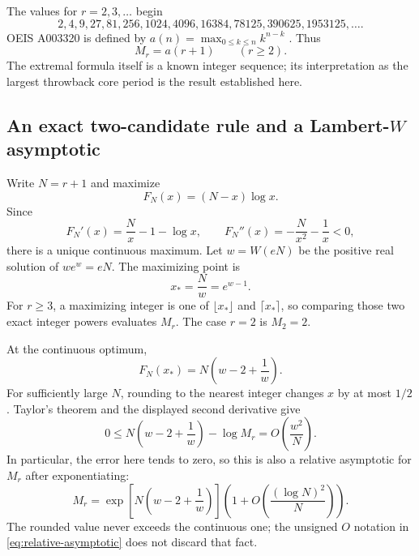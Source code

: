 \documentclass[11pt,letterpaper]{article}
\theoremstyle{definition}
\begin{document}
The values for $r=2,3,\ldots$ begin
\[
 2,4,9,27,81,256,1024,4096,16384,78125,390625,1953125,\ldots.
\]
OEIS A003320 is defined by $a(n)=\max_{0\le k\le n}k^{n-k}$
\cite{A003320}. Thus
\begin{equation}\label{eq:oeismax}
 M_r=a(r+1)\qquad(r\ge2).
\end{equation}
The extremal formula itself is a known integer sequence; its interpretation
as the largest throwback core period is the result established here.

\subsection{An exact two-candidate rule and a Lambert-\texorpdfstring{$W$}{W} asymptotic}
Write $N=r+1$ and maximize
\[
 F_N(x)=(N-x)\log x.
\]
Since
\[
 F_N'(x)=\frac Nx-1-\log x,
 \qquad F_N''(x)=-\frac N{x^2}-\frac1x<0,
\]
there is a unique continuous maximum. Let $w=W(eN)$ be the positive real
solution of $we^w=eN$. The maximizing point is
\begin{equation}\label{eq:kstar}
 x_*=\frac Nw=e^{w-1}.
\end{equation}
For $r\ge3$, a maximizing integer is one of
$\lfloor x_*\rfloor$ and $\lceil x_*\rceil$, so comparing those two exact
integer powers evaluates $M_r$. The case $r=2$ is $M_2=2$.

At the continuous optimum,
\begin{equation}\label{eq:continuous-max}
 F_N(x_*)=N\left(w-2+\frac1w\right).
\end{equation}
For sufficiently large $N$, rounding to the nearest integer changes $x$ by
at most $1/2$. Taylor's theorem and the displayed second derivative give
\begin{equation}\label{eq:rounding}
 0\le N\left(w-2+\frac1w\right)-\log M_r
       =O\left(\frac{w^2}{N}\right).
\end{equation}
In particular, the error here tends to zero, so this is also a relative
asymptotic for $M_r$ after exponentiating:
\begin{equation}\label{eq:relative-asymptotic}
 M_r=\exp\!\left[N\left(w-2+\frac1w\right)\right]
       \left(1+O\left(\frac{(\log N)^2}{N}\right)\right).
\end{equation}
The rounded value never exceeds the continuous one; the unsigned $O$ notation
in \eqref{eq:relative-asymptotic} does not discard that fact.
\end{document}
